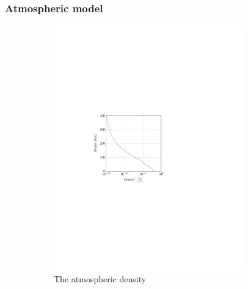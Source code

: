 \subsubsection{Atmospheric model}
\begin{figure}[h]
	\centering
	\begin{subfigure}{0.45\textwidth}
	\centering
	\includegraphics[trim={4cm 9.8cm 9cm 10cm},clip,width=0.9\textwidth]{Figure/atmos_model/density.pdf}
	\caption{The atmospheric density} 
	\label{fig:atmos_height_rho}
	\end{subfigure}
	\begin{subfigure}{0.45\textwidth}
	\centering

\end{subfigure}
\end{figure}
